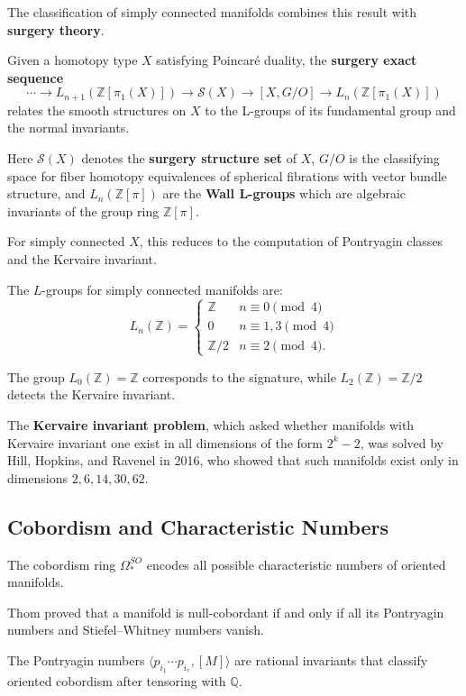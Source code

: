 The classification of simply connected manifolds combines this result with \textbf{surgery theory}.

Given a homotopy type $X$ satisfying Poincaré duality, the \textbf{surgery exact sequence}
\[
\cdots \to L_{n+1}(\mathbb{Z}[\pi_1(X)]) \to \mathcal{S}(X) \to [X, G/O] \to L_n(\mathbb{Z}[\pi_1(X)])
\]
relates the smooth structures on $X$ to the L-groups of its fundamental group and the normal invariants.

Here $\mathcal{S}(X)$ denotes the \textbf{surgery structure set} of $X$, $G/O$ is the classifying space for fiber homotopy equivalences of spherical fibrations with vector bundle structure, and $L_n(\mathbb{Z}[\pi])$ are the \textbf{Wall L-groups} which are algebraic invariants of the group ring $\mathbb{Z}[\pi]$.

For simply connected $X$, this reduces to the computation of Pontryagin classes and the Kervaire invariant.

The $L$-groups for simply connected manifolds are:
\[
L_n(\mathbb{Z}) = \begin{cases} \mathbb{Z} & n \equiv 0 \pmod{4} \\ 0 & n \equiv 1, 3 \pmod{4} \\ \mathbb{Z}/2 & n \equiv 2 \pmod{4}. \end{cases}
\]

The group $L_0(\mathbb{Z}) = \mathbb{Z}$ corresponds to the signature, while $L_2(\mathbb{Z}) = \mathbb{Z}/2$ detects the Kervaire invariant.

The \textbf{Kervaire invariant problem}, which asked whether manifolds with Kervaire invariant one exist in all dimensions of the form $2^k - 2$, was solved by Hill, Hopkins, and Ravenel in 2016, who showed that such manifolds exist only in dimensions $2, 6, 14, 30, 62$.

\subsection*{Cobordism and Characteristic Numbers}

The cobordism ring $\Omega_*^{SO}$ encodes all possible characteristic numbers of oriented manifolds.

Thom proved that a manifold is null-cobordant if and only if all its Pontryagin numbers and Stiefel--Whitney numbers vanish.

The Pontryagin numbers $\langle p_{i_1} \cdots p_{i_r}, [M] \rangle$ are rational invariants that classify oriented cobordism after tensoring with $\mathbb{Q}$.

